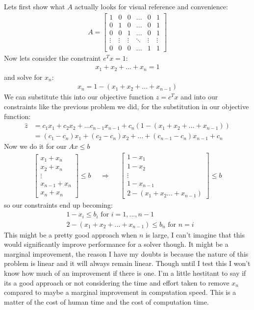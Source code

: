 \documentclass{article}
\begin{document}
Lets first show what $A$ actually looks for visual reference and convenience:
\begin{align*} A = 
    \begin{bmatrix}
        1 & 0 & 0 & ... & 0 & 1 \\
        0 & 1 & 0 & ... & 0 & 1 \\
        0 & 0 & 1 & ... & 0 & 1 \\ 
        \vdots & \vdots & \vdots & \ddots & \vdots & \vdots \\
        0 & 0 & 0 & ... & 1 & 1
    \end{bmatrix}
\end{align*}
Now lets consider the constraint $e^Tx = 1$:
\begin{align*}
    x_1 + x_2 + ... + x_n = 1
\end{align*}
and solve for $x_n$:
\begin{align*}
    x_n = 1 - (x_1 + x_2 + ... + x_{n-1})
\end{align*}
We can substitute this into our objective function $z = c^Tx$ and into our constraints like the previous problem we did, for the substitution in our objective function:
\begin{align*}
    \hat{z} &= c_1x_1 + c_2x_2 + ... c_{n-1}x_{n-1} + c_n(1 - (x_1 + x_2 + ... +x_{n-1})) \\ 
    &= (c_1-c_n)x_1 + (c_2-c_n)x_2 + ... + (c_{n-1} - c_n)x_{n-1} + c_n
\end{align*}
Now we do it for our $Ax \leq b$
\begin{align*}
    \begin{bmatrix}
        x_1 + x_n \\
        x_2 + x_n \\
        \vdots \\
        x_{n-1} + x_n \\
        x_n + x_n
    \end{bmatrix} \leq b && \Rightarrow &&
    \begin{bmatrix}
        1 - x_1 \\
        1 - x_2 \\
        \vdots \\
        1 - x_{n-1} \\
        2 - (x_1 + x_2... + x_{n-1})  
    \end{bmatrix} \leq b
\end{align*}
so our constraints end up becoming:
\begin{align*}
    & 1 - x_i \leq b_i \text{ for } i = 1,...,n-1\\
    & 2 - (x_1 + x_2 + ... + x_{n-1}) \leq b_n \text{ for } n = i
\end{align*}
This might be a pretty good approach when $n$ is large, I can't imagine that this would significantly improve performance for a solver though. It might be a marginal improvement, the reason I have my doubts is because the nature of this problem is linear and it will always remain linear. Though until I test this I won't know how much of an improvement if there is one. I'm a little hestitant to say if its a good approach or not considering the time and effort taken to remove $x_n$ compared to maybe a marginal improvement in computation speed. This is a matter of the cost of human time and the cost of computation time.
\end{document}
